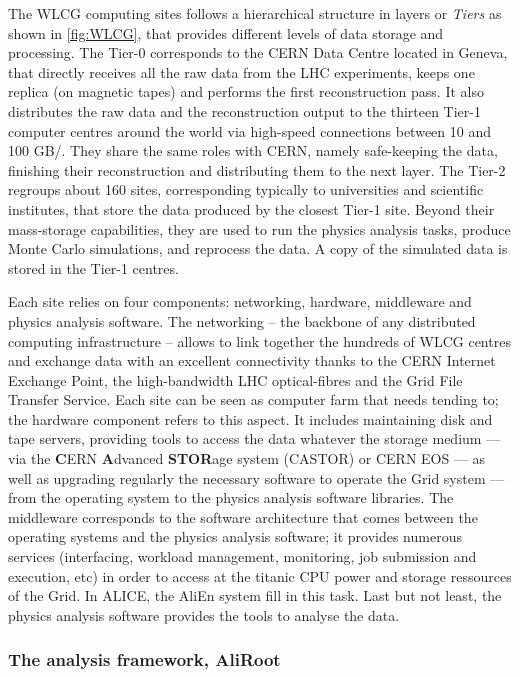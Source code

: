 The WLCG computing sites follows a hierarchical structure in layers or \textit{Tiers} as shown in \fig\ref{fig:WLCG}, that provides different levels of data storage and processing. The Tier-0 corresponds to the CERN Data Centre located in Geneva, that directly receives all the raw data from the LHC experiments, keeps one replica (on magnetic tapes) and performs the first reconstruction pass. It also distributes the raw data and the reconstruction output to the thirteen Tier-1 computer centres around the world via high-speed connections between 10 and 100 GB/\second. They share the same roles with CERN, namely safe-keeping the data, finishing their reconstruction and distributing them to the next layer. The Tier-2 regroups about 160 sites, corresponding typically to universities and scientific institutes, that store the data produced by the closest Tier-1 site. Beyond their mass-storage capabilities, they are used to run the physics analysis tasks, produce Monte Carlo simulations, and reprocess the data. A copy of the simulated data is stored in the Tier-1 centres.

Each site relies on four components: networking, hardware, middleware and physics analysis software. The networking -- the backbone of any distributed computing infrastructure -- allows to link together the hundreds of WLCG centres and exchange data with an excellent connectivity thanks to the CERN Internet Exchange Point, the high-bandwidth LHC optical-fibres and the Grid File Transfer Service. Each site can be seen as computer farm that needs tending to; the hardware component refers to this aspect. It includes maintaining disk and tape servers, providing tools to access the data whatever the storage medium --- via the \textbf{C}ERN \textbf{A}dvanced \textbf{STOR}age system (CASTOR) or CERN EOS --- as well as upgrading regularly the necessary software to operate the Grid system --- from the operating system to the physics analysis software libraries. The middleware corresponds to the software architecture that comes between the operating systems and the physics analysis software; it provides numerous services (interfacing, workload management, monitoring, job submission and execution, etc) in order to access at the titanic CPU power and storage ressources of the Grid. In ALICE, the AliEn system fill in this task. Last but not least, the physics analysis software provides the tools to analyse the data.


\subsubsection{The analysis framework, AliRoot}
\label{subsubsec:AliRoot}

